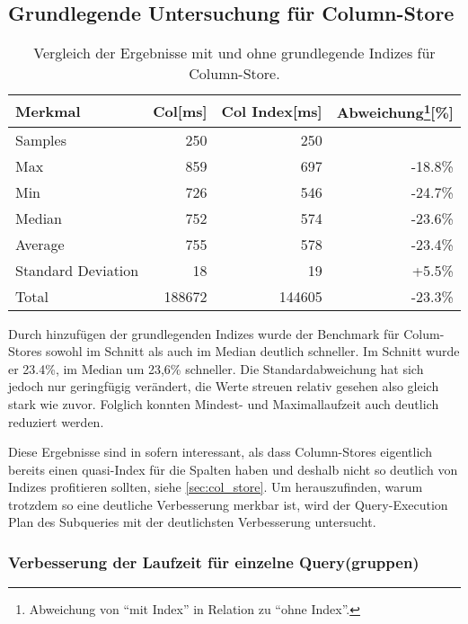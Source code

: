 \subsection{Grundlegende Untersuchung für Column-Store}

\begin{table}[H]
\centering
    \begin{tabularx}{10cm}{lrrr}
        \toprule
        Merkmal             &   Col[ms]    &    Col Index[ms] & Abweichung\footnote{Abweichung von \enquote{mit Index} in Relation zu \enquote{ohne Index}.}[\%]\\
        \toprule
        Samples             &   250        &   250      &        \\
        \midrule    
        Max                 &   859        &   697      & -18.8\%\\
        Min                 &   726        &   546      & -24.7\%\\
        Median              &   752        &   574      & -23.6\%\\
        Average             &   755        &   578      & -23.4\%\\
        Standard Deviation  &   18         &   19       & +5.5\%\\
        Total               &   188672     &   144605   & -23.3\%\\
        \bottomrule
    \end{tabularx}
\caption{Vergleich der Ergebnisse mit und ohne grundlegende Indizes für Column-Store.}
\label{tab:basic_index_col}
\end{table}

Durch hinzufügen der grundlegenden Indizes wurde der Benchmark für Colum-Stores sowohl im Schnitt als auch im Median deutlich schneller.
Im Schnitt wurde er 23.4\%, im Median um 23,6\% schneller. Die Standardabweichung hat sich jedoch nur geringfügig verändert, die Werte streuen relativ gesehen also gleich stark wie zuvor. Folglich konnten Mindest- und Maximallaufzeit auch deutlich reduziert werden. 


Diese Ergebnisse sind in sofern interessant, als dass Column-Stores eigentlich bereits einen quasi-Index für die Spalten haben und deshalb nicht so deutlich von Indizes profitieren sollten, siehe \ref{sec:col_store}.
Um herauszufinden, warum trotzdem so eine deutliche Verbesserung merkbar ist, wird der Query-Execution Plan des Subqueries mit der deutlichsten Verbesserung untersucht.

\subsubsection{Verbesserung der Laufzeit für einzelne Query(gruppen)}

